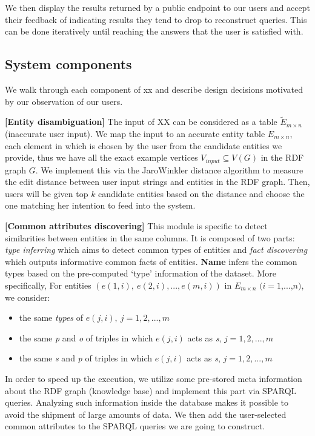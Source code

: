 \documentclass[10pt,conference,letterpaper]{IEEEtran}
\begin{document}
We then display the results returned by a public endpoint to our users and accept their 
feedback of indicating results they tend to drop to reconstruct queries. This can be done iteratively until reaching the 
answers that the user is satisfied with.

\subsection{System components}
We walk through each component of xx and describe design decisions motivated by our observation of our users.

\textbf{[Entity disambiguation]} 
The input of XX can be considered as a table $\tilde{E}_{m \times n}$ (inaccurate user input). We map the input to an accurate entity table $E_{m \times n}$, each element in which is
chosen by the user from the candidate entities we provide, thus
we have all the exact example vertices $V_{input} \subseteq V(G)$ 
in the RDF graph $G$.
We implement this via the JaroWinkler distance algorithm to measure the edit distance between user input strings and entities in the RDF graph. Then, users will be given top $k$ candidate entities based on the distance and choose the one matching her intention to feed into the system. 

\textbf{[Common attributes discovering]}
This module is specific to detect similarities between entities in the same columns. It is composed of two parts: \emph{type inferring} which aims to detect common types of entities and \emph{fact discovering} which 
outputs informative common facts of entities. 
\textbf{Name} infers the common types based on the pre-computed `type' information of the dataset. More specifically,
For entities $(e(1,i),\  e(2,i),..., e(m,i))$ in $E_{m \times n}$ $(i = 1$,...,$n)$,
we consider:
	
\begin{itemize}
    \item the same \emph{types} of $e(j,i),\ j=1,2,...,m$
    \item the same \emph{p} and \emph{o} of triples in which $e(j,i)$
    acts as \emph{s}, $j=1,2,...,m$
    \item the same \emph{s} and \emph{p} of triples in which $e(j,i)$
    acts as \emph{s}, $j=1,2,...,m$
\end{itemize}

\vspace{0.6ex}
In order to speed up the execution, we utilize some pre-stored meta information about the RDF graph (knowledge base) and implement this part via SPARQL queries. Analyzing such information inside the database makes it possible to avoid the shipment of large amounts of data. We then add the user-selected common attributes to the SPARQL queries we are going to construct.
\end{document}

